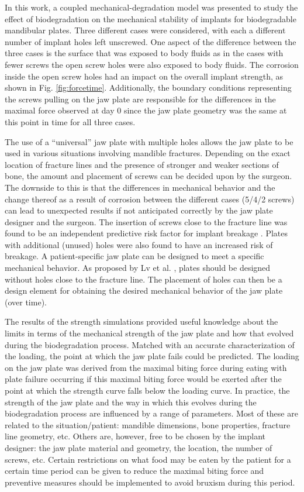 In this work, a coupled mechanical-degradation model was presented to study the effect of biodegradation on the mechanical stability of implants for biodegradable mandibular plates. Three different cases were considered, with each a different number of implant holes left unscrewed. One aspect of the difference between the three cases is the surface that was exposed to body fluids as in the cases with fewer screws the open screw holes were also exposed to body fluids. The corrosion inside the open screw holes had an impact on the overall implant strength, as shown in Fig. \ref{fig:forcetime}. Additionally, the boundary conditions representing the screws pulling on the jaw plate are responsible for the differences in the maximal force observed at day 0 since the jaw plate geometry was the same at this point in time for all three cases.

The use of a ``universal'' jaw plate with multiple holes allows the jaw plate to be used in various situations involving mandible fractures. Depending on the exact location of fracture lines and the presence of stronger and weaker sections of bone, the amount and placement of screws can be decided upon by the surgeon. The downside to this is that the differences in mechanical behavior and the change thereof as a result of corrosion between the different cases (5/4/2 screws) can lead to unexpected results if not anticipated correctly by the jaw plate designer and the surgeon. The insertion of screws close to the fracture line was found to be an independent predictive risk factor for implant breakage \cite{Lv2017}. Plates with additional (unused) holes were also found to have an increased risk of breakage. A patient-specific jaw plate can be designed to meet a specific mechanical behavior. As proposed by Lv et al. \cite{Lv2017}, plates should be designed without holes close to the fracture line. The placement of holes can then be a design element for obtaining the desired mechanical behavior of the jaw plate (over time).

The results of the strength simulations provided useful knowledge about the limits in terms of the mechanical strength of the jaw plate and how that evolved during the biodegradation process. Matched with an accurate characterization of the loading, the point at which the jaw plate fails could be predicted. The loading on the jaw plate was derived from the maximal biting force during eating with plate failure occurring if this maximal biting force would be exerted after the point at which the strength curve falls below the loading curve. In practice, the strength of the jaw plate and the way in which this evolves during the biodegradation process are influenced by a range of parameters. Most of these are related to the situation/patient: mandible dimensions, bone properties, fracture line geometry, etc. Others are, however, free to be chosen by the implant designer: the jaw plate material and geometry, the location, the number of screws, etc. Certain restrictions on what food may be eaten by the patient for a certain time period can be given to reduce the maximal biting force and preventive measures should be implemented to avoid bruxism during this period. 

